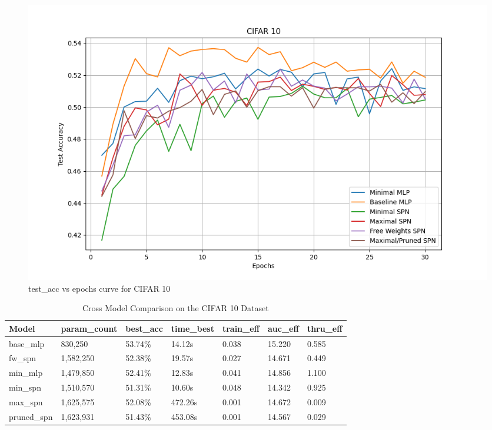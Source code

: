 \begin{figure}[H]
    \centering
    \includegraphics[width=\linewidth]{Figures/Results/CIFAR_10/test_accuracy_plot.png} %
    \captionsetup{width=\linewidth}
    \caption{test\_acc vs epochs curve for CIFAR 10}
    \label{fig:cifarTestCurve}
\end{figure}

\begin{table}[h!]
    \centering
    \caption{Cross Model Comparison on the CIFAR 10 Dataset}
    \begin{tabular}{|l|l|l|l|l|l|l|}
    \hline
    \textbf{Model} & \textbf{param\_count} & \textbf{best\_acc} & \textbf{time\_best} & \textbf{train\_eff} & \textbf{auc\_eff} & \textbf{thru\_eff} \\
    \hline
    base\_mlp & 830,250 & \cellcolor{green!25}53.74\% & 14.12s & 0.038 & \cellcolor{green!25}15.220 & 0.585 \\
    fw\_spn & 1,582,250 & 52.38\% & 19.57s & 0.027 & 14.671 & 0.449 \\
    min\_mlp & 1,479,850 & 52.41\% & 12.83s & 0.041 & 14.856 & \cellcolor{green!25}1.100 \\
    min\_spn & 1,510,570 & \cellcolor{red!25}51.31\% & \cellcolor{green!25}10.60s & \cellcolor{green!25}0.048 & \cellcolor{red!25}14.342 & 0.925 \\
    max\_spn & 1,625,575 & 52.08\% & \cellcolor{red!25}472.26s & \cellcolor{red!25}0.001 & 14.672 & \cellcolor{red!25}0.009 \\
    pruned\_spn & 1,623,931 & 51.43\% & 453.08s & \cellcolor{red!25}0.001 & 14.567 & 0.029 \\
    \hline
    \end{tabular}
    \label{tab:cifarResults}
\end{table}

